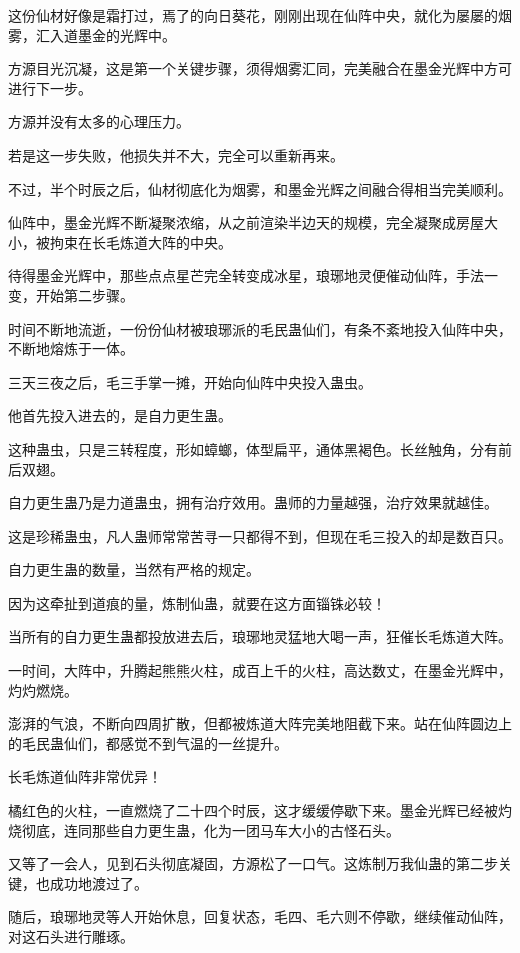 \begin{this_body}
这份仙材好像是霜打过，焉了的向日葵花，刚刚出现在仙阵中央，就化为屡屡的烟雾，汇入道墨金的光辉中。

方源目光沉凝，这是第一个关键步骤，须得烟雾汇同，完美融合在墨金光辉中方可进行下一步。

方源并没有太多的心理压力。

若是这一步失败，他损失并不大，完全可以重新再来。

不过，半个时辰之后，仙材彻底化为烟雾，和墨金光辉之间融合得相当完美顺利。

仙阵中，墨金光辉不断凝聚浓缩，从之前渲染半边天的规模，完全凝聚成房屋大小，被拘束在长毛炼道大阵的中央。

待得墨金光辉中，那些点点星芒完全转变成冰星，琅琊地灵便催动仙阵，手法一变，开始第二步骤。

时间不断地流逝，一份份仙材被琅琊派的毛民蛊仙们，有条不紊地投入仙阵中央，不断地熔炼于一体。

三天三夜之后，毛三手掌一摊，开始向仙阵中央投入蛊虫。

他首先投入进去的，是自力更生蛊。

这种蛊虫，只是三转程度，形如蟑螂，体型扁平，通体黑褐色。长丝触角，分有前后双翅。

自力更生蛊乃是力道蛊虫，拥有治疗效用。蛊师的力量越强，治疗效果就越佳。

这是珍稀蛊虫，凡人蛊师常常苦寻一只都得不到，但现在毛三投入的却是数百只。

自力更生蛊的数量，当然有严格的规定。

因为这牵扯到道痕的量，炼制仙蛊，就要在这方面锱铢必较！

当所有的自力更生蛊都投放进去后，琅琊地灵猛地大喝一声，狂催长毛炼道大阵。

一时间，大阵中，升腾起熊熊火柱，成百上千的火柱，高达数丈，在墨金光辉中，灼灼燃烧。

澎湃的气浪，不断向四周扩散，但都被炼道大阵完美地阻截下来。站在仙阵圆边上的毛民蛊仙们，都感觉不到气温的一丝提升。

长毛炼道仙阵非常优异！

橘红色的火柱，一直燃烧了二十四个时辰，这才缓缓停歇下来。墨金光辉已经被灼烧彻底，连同那些自力更生蛊，化为一团马车大小的古怪石头。

又等了一会人，见到石头彻底凝固，方源松了一口气。这炼制万我仙蛊的第二步关键，也成功地渡过了。

随后，琅琊地灵等人开始休息，回复状态，毛四、毛六则不停歇，继续催动仙阵，对这石头进行雕琢。


\end{this_body}
